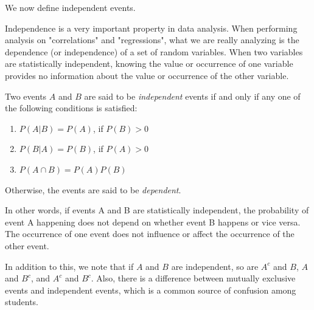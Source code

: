 \documentclass{article}
\begin{document}
We now define independent events.

Independence is a very important property in data analysis. When performing analysis on "correlations" and "regressions", what we are really analyzing is the dependence (or independence) of a set of random variables. When two variables are statistically independent, knowing the value or occurrence of one variable provides no information about the value or occurrence of the other variable.

Two events $A$ and $B$ are said to be \emph{independent} events if and only if any one of the following conditions is satisfied:

\begin{enumerate}
    \item $P(A|B) = P(A)$, if $P(B) > 0$
    \item $P(B|A) = P(B)$, if $P(A) > 0$
    \item $P(A \cap B) = P(A)P(B)$
\end{enumerate}

Otherwise, the events are said to be \emph{dependent}.

In other words, if events A and B are statistically independent, the probability of event A happening does not depend on whether event B happens or vice versa. The occurrence of one event does not influence or affect the occurrence of the other event.

In addition to this, we note that if $A$ and $B$ are independent, so are $A^c$ and $B$, $A$ and $B^c$, and $A^c$ and $B^c$. Also, there is a difference between mutually exclusive events and independent events, which is a common source of confusion among students.
\end{document}
